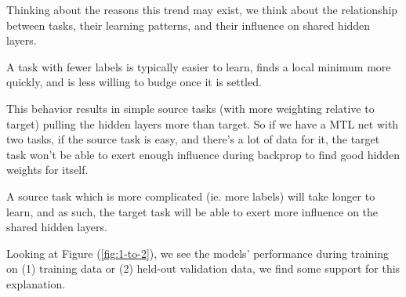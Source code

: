 \documentclass[a4paper]{article}
\begin{document}
Thinking about the reasons this trend may exist, we think about the relationship between tasks, their learning patterns, and their influence on shared hidden layers.

A task with fewer labels is typically easier to learn, finds a local minimum more quickly, and is less willing to budge once it is settled.

This behavior results in simple source tasks (with more weighting relative to target) pulling the hidden layers more than target. So if we have a MTL net with two tasks, if the source task is easy, and there's a lot of data for it, the target task won't be able to exert enough influence during backprop to find good hidden weights for itself.

A source task which is more complicated (ie. more labels) will take longer to learn, and as such, the target task will be able to exert more influence on the shared hidden layers.


Looking at Figure (\ref{fig:1-to-2}), we see the models' performance during training on (1) training data or (2) held-out validation data, we find some support for this explanation.
\end{document}
